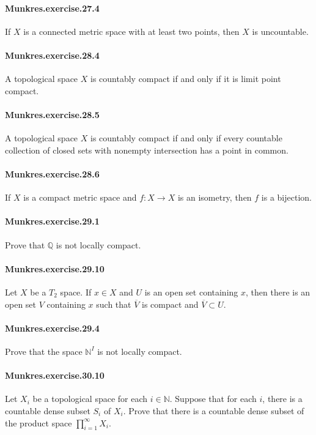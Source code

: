 \documentclass{article}
\begin{document}
\paragraph{Munkres.exercise.27.4} If $X$ is a connected metric space with at least two points, then $X$ is uncountable.

\paragraph{Munkres.exercise.28.4} A topological space $X$ is countably compact if and only if it is limit point compact.

\paragraph{Munkres.exercise.28.5} A topological space $X$ is countably compact if and only if every countable collection of closed sets with nonempty intersection has a point in common.

\paragraph{Munkres.exercise.28.6} If $X$ is a compact metric space and $f:X\to X$ is an isometry, then $f$ is a bijection.

\paragraph{Munkres.exercise.29.1} Prove that $\mathbb{Q}$ is not locally compact.

\paragraph{Munkres.exercise.29.10} Let $X$ be a $T_2$ space. If $x\in X$ and $U$ is an open set containing $x$, then there is an open set $V$ containing $x$ such that $\overline{V}$ is compact and $\overline{V}\subset U$.

\paragraph{Munkres.exercise.29.4} Prove that the space $\mathbb{N}^I$ is not locally compact.

\paragraph{Munkres.exercise.30.10} Let $X_i$ be a topological space for each $i\in\mathbb{N}$. Suppose that for each $i$, there is a countable dense subset $S_i$ of $X_i$. Prove that there is a countable dense subset of the product space $\prod_{i=1}^\infty X_i$.
\end{document}

